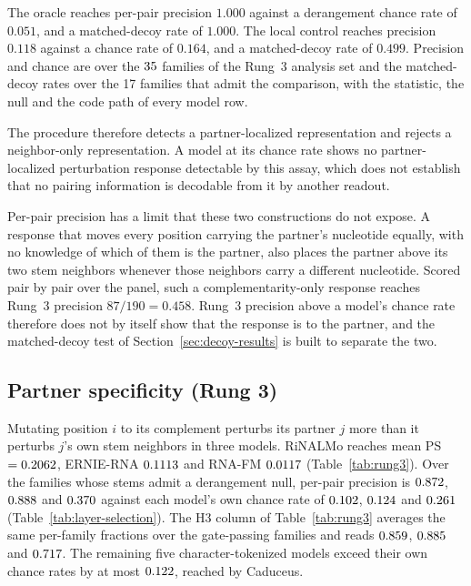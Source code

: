 \documentclass[11pt]{article}
\begin{document}
The oracle reaches per-pair precision $1.000$ against a derangement chance rate
of $0.051$, and a matched-decoy rate of $1.000$. The local control reaches
precision $0.118$ against a chance rate of $0.164$, and a matched-decoy rate of
$0.499$. Precision and chance are over the $35{}$ families of the
Rung~3 analysis set and the matched-decoy rates over the 17 families that admit
the comparison, with the statistic, the null and the code path of every model
row.

The procedure therefore detects a partner-localized representation and rejects
a neighbor-only representation. A model at its chance rate shows no
partner-localized perturbation response detectable by this assay, which does not
establish that no pairing information is decodable from it by another readout.

Per-pair precision has a limit that these two constructions do not expose. A
response that moves every position carrying the partner's nucleotide equally,
with no knowledge of which of them is the partner, also places the partner above
its two stem neighbors whenever those neighbors carry a different nucleotide.
Scored pair by pair over the panel, such a complementarity-only response reaches
Rung~3 precision $87/190 = 0.458$. Rung~3 precision above a model's chance rate
therefore does not by itself show that the response is to the partner, and the
matched-decoy test of Section~\ref{sec:decoy-results} is built to separate the
two.

\subsection{Partner specificity (Rung 3)}
\label{sec:ps-results}







Mutating position $i$ to its complement perturbs its partner $j$ more than it
perturbs $j$'s own stem neighbors in three models. RiNALMo reaches mean
PS $= 0.2062{}$, ERNIE-RNA $0.1113{}$ and RNA-FM $0.0117{}$
(Table~\ref{tab:rung3}). Over the \chanceRateN{} families whose stems admit a
derangement null, per-pair precision is $0.872{}$,
$0.888{}$ and $0.370{}$ against each model's own
chance rate of $0.102{}$, $0.124{}$ and
$0.261{}$ (Table~\ref{tab:layer-selection}). The H3 column of
Table~\ref{tab:rung3} averages the same per-family fractions over the
gate-passing families and reads $0.859{}$, $0.885{}$ and
$0.717{}$. The remaining five character-tokenized models exceed their own
chance rates by at most $0.122{}$, reached by Caduceus.
\end{document}
